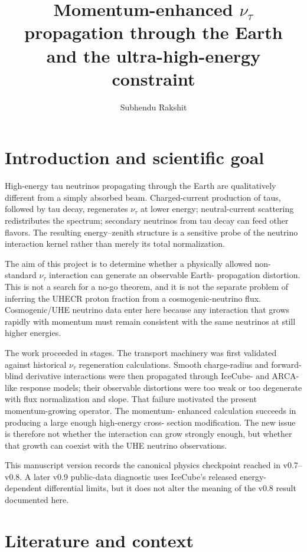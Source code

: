 \documentclass[11pt,a4paper]{article}
\title{Momentum-enhanced $\nu_\tau$ propagation through the Earth\\
and the ultra-high-energy constraint}
\author{Subhendu Rakshit}
\begin{document}
\maketitle
\flushbottom
\tableofcontents

\section{Introduction and scientific goal}
High-energy tau neutrinos propagating through the Earth are qualitatively
different from a simply absorbed beam.  Charged-current production of taus,
followed by tau decay, regenerates $\nu_\tau$ at lower energy; neutral-current
scattering redistributes the spectrum; secondary neutrinos from tau decay can
feed other flavors.  The resulting energy--zenith structure is a sensitive
probe of the neutrino interaction kernel rather than merely its total
normalization.

The aim of this project is to determine whether a physically allowed
non-standard $\nu_\tau$ interaction can generate an observable Earth-
propagation distortion.  This is not a search for a no-go theorem, and it is
not the separate problem of inferring the UHECR proton fraction from a
cosmogenic-neutrino flux.  Cosmogenic/UHE neutrino data enter here because any
interaction that grows rapidly with momentum must remain consistent with the
same neutrinos at still higher energies.

The work proceeded in stages.  The transport machinery was first validated
against historical $\nu_\tau$ regeneration calculations.  Smooth
charge-radius and forward-blind derivative interactions were then propagated
through IceCube- and ARCA-like response models; their observable distortions
were too weak or too degenerate with flux normalization and slope.  That
failure motivated the present momentum-growing operator.  The momentum-
enhanced calculation succeeds in producing a large enough high-energy cross-
section modification.  The new issue is therefore not whether the interaction
can grow strongly enough, but whether that growth can coexist with the UHE
neutrino observations.

This manuscript version records the canonical physics checkpoint reached in
v0.7--v0.8.  A later v0.9 public-data diagnostic uses IceCube's released
energy-dependent differential limits, but it does not alter the meaning of the
v0.8 result documented here.

\section{Literature and context}
\end{document}

